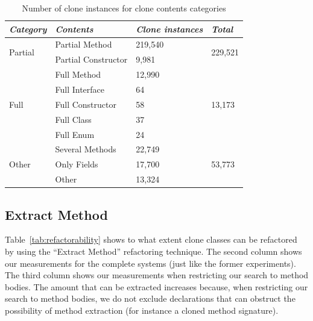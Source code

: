 \begin{table}[H]
\centering
\begin{tabular}{@{}llll@{}}
\toprule
\textit{\textbf{Category}} & \textit{\textbf{Contents}} & \textit{\textbf{Clone instances}} & \textit{\textbf{Total}} \\ \midrule
\multirow{2}{*}{Partial} & Partial Method & 219,540 & \multirow{2}{*}{229,521} \\ \cmidrule(lr){2-3}
 & Partial Constructor & 9,981 &  \\ \midrule
\multirow{5}{*}{Full} & Full Method & 12,990 & \multirow{5}{*}{13,173} \\ \cmidrule(lr){2-3}
 & Full Interface & 64 &  \\ \cmidrule(lr){2-3}
 & Full Constructor & 58 &  \\ \cmidrule(lr){2-3}
 & Full Class & 37 &  \\ \cmidrule(lr){2-3}
 & Full Enum & 24 &  \\ \midrule
\multirow{3}{*}{Other} & Several Methods & 22,749 & \multirow{3}{*}{53,773} \\ \cmidrule(lr){2-3}
 & Only Fields & 17,700 &  \\ \cmidrule(lr){2-3}
 & Other & 13,324 &  \\ \bottomrule
\end{tabular}
\caption{Number of clone instances for clone contents categories}
\label{tab:contents}
\end{table}

\subsection{Extract Method}
Table~\ref{tab:refactorability} shows to what extent clone classes can be refactored by using the ``Extract Method'' refactoring technique. The second column shows our measurements for the complete systems (just like the former experiments). The third column shows our measurements when restricting our search to method bodies. The amount that can be extracted increases because, when restricting our search to method bodies, we do not exclude declarations that can obstruct the possibility of method extraction (for instance a cloned method signature).

